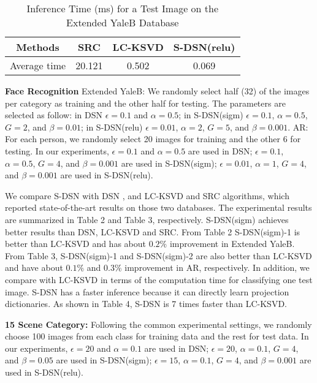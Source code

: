 \documentclass[letterpaper]{article}
\begin{document}
\begin{table}
\vskip -0.2in
\small{\caption{Inference Time (ms) for a Test Image on the Extended YaleB Database}}
\label{tab:inftimeExtYaleB}
\begin{center}
\small{
\begin{tabular}{c|c|c|c}
\hline
  Methods         & SRC  &    LC-KSVD  &   S-DSN(relu)    \\
\hline
Average time  & 20.121 &  0.502       &     0.069  \\
\hline
\end{tabular}}
\end{center}
\end{table}

\textbf{Face Recognition}
Extended YaleB: We randomly select half (32) of the images per category as training and the other half for testing. The parameters are selected as follow: in DSN $\epsilon=0.1$ and $\alpha=0.5$; in S-DSN(sigm) $\epsilon=0.1$, $\alpha=0.5$, $G=2$, and $\beta=0.01$; in S-DSN(relu) $\epsilon=0.01$, $\alpha=2$, $G=5$, and $\beta=0.001$.
AR: For each person, we randomly select 20 images for training and the other 6 for testing. In our experiments, $\epsilon=0.1$ and $\alpha=0.5$ are used in DSN; $\epsilon=0.1$, $\alpha=0.5$, $G=4$, and $\beta=0.001$ are used in S-DSN(sigm); $\epsilon=0.01$, $\alpha=1$, $G=4$, and $\beta=0.001$ are used in S-DSN(relu).

We compare S-DSN with DSN \cite{Deng2011b}, and LC-KSVD \cite{Jiang2013} and SRC \cite{Wright2009} algorithms, which reported state-of-the-art results on those two databases. The experimental results are summarized in Table 2 and Table 3, respectively. S-DSN(sigm) achieves better results than DSN, LC-KSVD and SRC. From Table 2 S-DSN(sigm)-1 is better than LC-KSVD and has about $0.2\%$ improvement in Extended YaleB. From Table 3, S-DSN(sigm)-1 and S-DSN(sigm)-2 are also better than LC-KSVD and have about $0.1\%$ and $0.3\%$ improvement in AR, respectively. In addition, we compare with LC-KSVD in terms of the computation time for classifying one test image.  S-DSN has a faster inference because it can directly learn projection dictionaries. As shown in Table 4, S-DSN is 7 times faster than LC-KSVD.

\textbf{15 Scene Category:}
Following the common experimental settings, we randomly choose 100 images from each class for training data and the rest for test data. In our experiments, $\epsilon=20$ and $\alpha=0.1$ are used in DSN; $\epsilon=20$, $\alpha=0.1$, $G=4$, and $\beta=0.05$ are used in S-DSN(sigm); $\epsilon=15$, $\alpha=0.1$, $G=4$, and $\beta=0.001$ are used in S-DSN(relu).
\end{document}
